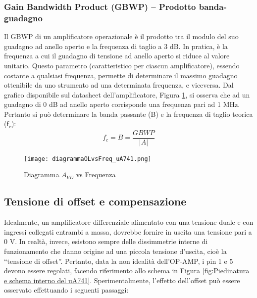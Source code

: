 \subsubsection{Gain Bandwidth Product (GBWP) – Prodotto banda-guadagno}
Il GBWP di un amplificatore operazionale è il prodotto tra il modulo del suo guadagno ad anello aperto e la frequenza di taglio a 3 dB. In pratica, è la frequenza a cui il guadagno di tensione ad anello aperto si riduce al valore unitario. Questo parametro (caratteristico per ciascun amplificatore), essendo costante a qualsiasi
frequenza, permette di determinare il massimo guadagno ottenibile da uno strumento ad una determinata frequenza, e viceversa. Dal grafico disponibile sul datasheet dell’amplificatore, Figura \ref{fig:Diagramma Avd vs Frequenza},  si osserva che ad un guadagno di 0 dB ad anello aperto corrisponde una frequenza pari ad 1 MHz.
Pertanto si può determinare la banda passante (B) e la frequenza di taglio teorica (f\textsubscript{c}):
\[f_c=B=\frac{GBWP}{|A|}\]
\begin{figure}[h]
    \centering
    \texttt{[image: diagrammaOLvsFreq\_uA741.png]}
    \caption{Diagramma $A_{VD}$ vs Frequenza}
    \label{fig:Diagramma Avd vs Frequenza}
\end{figure}
\FloatBarrier
\clearpage

\subsection{Tensione di offset e compensazione}
Idealmente, un amplificatore differenziale alimentato con una tensione duale e con ingressi collegati entrambi a massa, dovrebbe fornire in uscita una tensione pari a 0 V. In realtà, invece, esistono sempre delle dissimmetrie interne di funzionamento che danno origine ad una piccola tensione d’uscita, cioè la “tensione di offset”. Pertanto, data la non idealità dell'OP-AMP, i pin 1 e 5 devono essere regolati, facendo riferimento allo schema in Figura \ref{fig:Piedinatura e schema interno del uA741}. Sperimentalmente, l’effetto dell’offset può essere osservato effettuando i seguenti passaggi:

